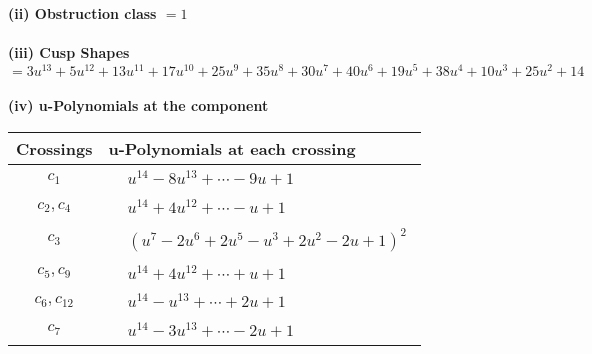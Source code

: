 \documentclass[1p]{elsarticle_modified}
\theoremstyle{definition}
\begin{document}
\flushleft \textbf{(ii) Obstruction class $= 1$}\\~\\
\flushleft \textbf{(iii) Cusp Shapes $= 3 u^{13}+5 u^{12}+13 u^{11}+17 u^{10}+25 u^9+35 u^8+30 u^7+40 u^6+19 u^5+38 u^4+10 u^3+25 u^2+14$}\\~\\
\newpage\renewcommand{\arraystretch}{1}
\flushleft \textbf{(iv) u-Polynomials at the component}\newline \\
\begin{tabular}{m{50pt}|m{274pt}}
Crossings & \hspace{64pt}u-Polynomials at each crossing \\
\hline $$\begin{aligned}c_{1}\end{aligned}$$&$\begin{aligned}
&u^{14}-8 u^{13}+\cdots-9 u+1
\end{aligned}$\\
\hline $$\begin{aligned}c_{2},c_{4}\end{aligned}$$&$\begin{aligned}
&u^{14}+4 u^{12}+\cdots- u+1
\end{aligned}$\\
\hline $$\begin{aligned}c_{3}\end{aligned}$$&$\begin{aligned}
&(u^7-2 u^6+2 u^5- u^3+2 u^2-2 u+1)^2
\end{aligned}$\\
\hline $$\begin{aligned}c_{5},c_{9}\end{aligned}$$&$\begin{aligned}
&u^{14}+4 u^{12}+\cdots+u+1
\end{aligned}$\\
\hline $$\begin{aligned}c_{6},c_{12}\end{aligned}$$&$\begin{aligned}
&u^{14}- u^{13}+\cdots+2 u+1
\end{aligned}$\\
\hline $$\begin{aligned}c_{7}\end{aligned}$$&$\begin{aligned}
&u^{14}-3 u^{13}+\cdots-2 u+1
\end{aligned}$\\

\end{tabular}
\end{document}
